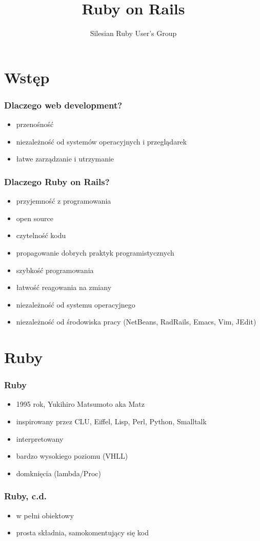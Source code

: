 \documentclass[12t]{beamer}
\author{Silesian Ruby User's Group}
\title{Ruby on Rails}
\begin{document}
\frame{\titlepage}

\section{Wstęp}
\begin{frame}
  \frametitle{Dlaczego web development?}
  \begin{itemize}
  \item przenośność
  \item niezależność od systemów operacyjnych i przeglądarek
  \item łatwe zarządzanie i utrzymanie
  \end{itemize}
\end{frame}

\begin{frame}
  \frametitle{Dlaczego Ruby on Rails?}
  \begin{itemize}
  \item przyjemność z programowania
  \item open source
  \item czytelność kodu
  \item propagowanie dobrych praktyk programistycznych
  \item szybkość programowania
  \item łatwość reagowania na zmiany
  \item niezależność od systemu operacyjnego
  \item niezależność od środowiska pracy (NetBeans, RadRails, Emacs,
    Vim, JEdit)
  \end{itemize}
\end{frame}

\section{Ruby}
\begin{frame}
  \frametitle{Ruby}
  \begin{itemize}
  \item 1995 rok, Yukihiro Matsumoto aka Matz
  \item inspirowany przez CLU, Eiffel, Lisp, Perl, Python, Smalltalk
  \item interpretowany
  \item bardzo wysokiego poziomu (VHLL)
  \item domknięcia (lambda/Proc)
  \end{itemize}
\end{frame}

\begin{frame}
  \frametitle{Ruby, c.d.}
  \begin{itemize}
  \item w pełni obiektowy
  \item prosta składnia, samokomentujący się kod
	
  \end{itemize}
\end{frame}
\end{document}
